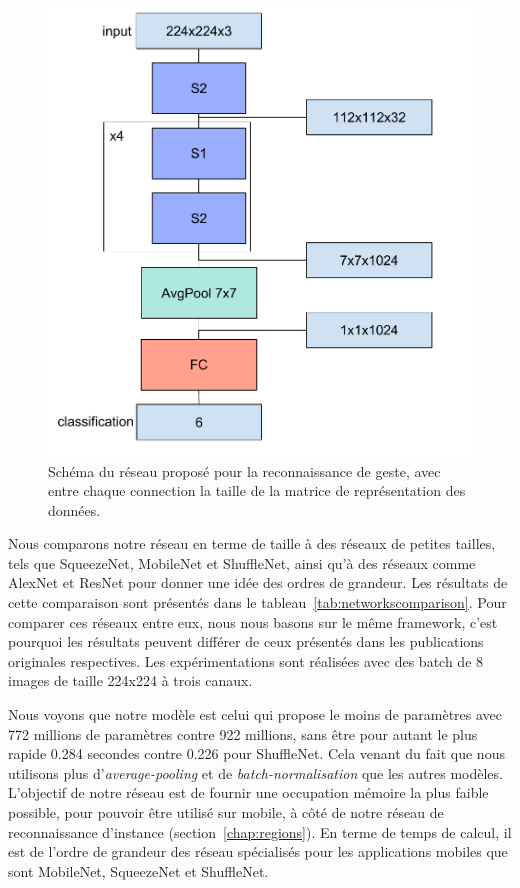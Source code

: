 \begin{figure}
\centering
\includegraphics[width=\columnwidth]{figures/Reseau1frame.pdf}%
\caption{Schéma du réseau proposé pour la reconnaissance de geste, avec entre chaque connection la taille de la matrice de représentation des données.}%
\label{fig:reseau1frame}%
\end{figure}


Nous comparons notre réseau en terme de taille à des réseaux de petites tailles, tels que SqueezeNet, MobileNet et ShuffleNet, ainsi qu’à des réseaux comme AlexNet et ResNet pour donner une idée des ordres de grandeur.
Les résultats de cette comparaison sont présentés dans le tableau~\ref{tab:networkscomparison}.
Pour comparer ces réseaux entre eux, nous nous basons sur le même framework, c'est pourquoi les résultats peuvent différer de ceux présentés dans les publications originales respectives.
Les expérimentations sont réalisées avec des batch de 8 images de taille 224x224 à trois canaux.

Nous voyons que notre modèle est celui qui propose le moins de paramètres avec 772 millions de paramètres contre 922 millions, sans être pour autant le plus rapide 0.284 secondes contre 0.226 pour ShuffleNet.
Cela venant du fait que nous utilisons plus d'\textit{average-pooling} et de \textit{batch-normalisation} que les autres modèles.
L'objectif de notre réseau est de fournir une occupation mémoire la plus faible possible, pour pouvoir être utilisé sur mobile, à côté de notre réseau de reconnaissance d'instance (section~\ref{chap:regions}).
En terme de temps de calcul, il est de l'ordre de grandeur des réseau spécialisés pour les applications mobiles que sont MobileNet, SqueezeNet et ShuffleNet.

